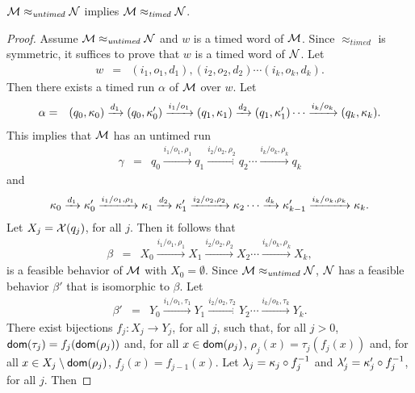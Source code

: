 \begin{theorem}
\label{untimedimpliestimed}
${\cal M} \approx_{\mathit{untimed}} {\cal N}$
implies
${\cal M} \approx_{\mathit{timed}} {\cal N}$.
\end{theorem}
\begin{proof}
Assume ${\cal M} \approx_{\mathit{untimed}} {\cal N}$ and $w$ is a timed word of ${\cal M}$.
Since $\approx_{\mathit{timed}}$ is symmetric, it suffices to prove that $w$ is a timed word of ${\cal N}$.
Let
\begin{eqnarray*}
w & = &  (i_1, o_1, d_1), (i_2, o_2, d_2) \cdots (i_k, o_k, d_k).
\end{eqnarray*}
Then there exists a timed run $\alpha$ of ${\cal M}$ over $w$. Let 
\begin{eqnarray*}
\alpha & = & (q_0, \kappa_0) \xrightarrow{d_1} (q_0, \kappa'_0) \xrightarrow{i_1/o_1} (q_1, \kappa_1) \xrightarrow{d_2} (q_1, \kappa'_1)  \cdots
 \xrightarrow{i_k/o_k} (q_k, \kappa_k).
\end{eqnarray*}
This implies that ${\cal M}$ has an untimed run
\begin{eqnarray*}
\gamma & = & q_0 \xrightarrow{i_1/o_1, \rho_1} q_1  \xrightarrow{i_2/o_2, \rho_2} q_2 \cdots \xrightarrow{i_k/o_k, \rho_k} q_k
\end{eqnarray*}
and
\[
\kappa_0 \xrightarrow{d_1} \kappa'_0 \xrightarrow{i_1/o_1, \rho_1} \kappa_1 \xrightarrow{d_2} \kappa'_1 \xrightarrow{i_2/o_2, \rho_2} \kappa_2 \cdots
\xrightarrow{d_k} \kappa'_{k-1} \xrightarrow{i_k/o_k, \rho_k} \kappa_{k}.
\]
Let $X_j = \mathcal{X}(q_j)$, for all $j$. Then it follows that
\begin{eqnarray*}
\beta & = & X_0 \xrightarrow{i_1/o_1, \rho_1} X_1  \xrightarrow{i_2/o_2, \rho_2} X_2 \cdots \xrightarrow{i_k/o_k, \rho_k} X_{k},
\end{eqnarray*}
is a feasible behavior of ${\cal M}$ with $X_0 = \emptyset$.
Since  ${\cal M} \approx_{\mathit{untimed}} {\cal N}$, ${\cal N}$ has a feasible behavior $\beta'$ that is isomorphic to $\beta$.
Let
\begin{eqnarray*}
\beta' & = & Y_0 \xrightarrow{i_1/o_1, \tau_1} Y_1  \xrightarrow{i_2/o_2, \tau_2} Y_2 \cdots \xrightarrow{i_k/o_k, \tau_k} Y_{k}.
\end{eqnarray*}
There exist bijections $f_j : X_j \rightarrow Y_j$, for all $j$, such that, for all $j>0$, ${\textsf{dom}}(\tau_j) = f_j({\textsf{dom}}(\rho_j))$ and, for all $x \in{\textsf{dom}}(\rho_j)$,
$\rho_j(x) = \tau_j (f_j(x))$ and, for all $x \in X_j \setminus {\textsf{dom}}(\rho_j)$, $f_j(x) = f_{j-1}(x)$.
Let $\lambda_j = \kappa_j \circ f_j^{-1}$ and $\lambda'_j = \kappa'_j \circ f_j^{-1}$, for all $j$. Then

\end{proof}
